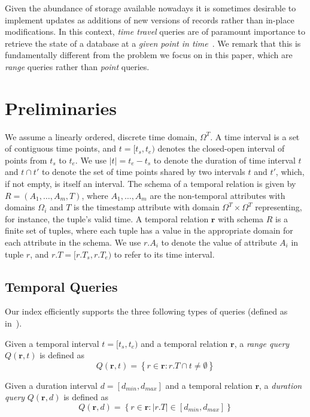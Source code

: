 \documentclass[sigconf,nonacm,anonymous]{acmart}
\theoremstyle{definition}
\newcommand{\domT}{\ensuremath{\Omega^T}}
\newcommand{\args}[2]{#1_1,\dots,#1_{#2}}
\newcommand{\R}{\ensuremath{\mathbf{r}}\xspace} %
\newcommand{\T}{\ensuremath{t}} %
\newcommand{\D}{\ensuremath{d}} %
\newcommand{\TS}{\ensuremath{t_s}}
\newcommand{\TE}{\ensuremath{t_e}}
\newcommand{\rTE}{\ensuremath{r.T_e}}
\newcommand{\rTS}{\ensuremath{r.T_s}}
\newcommand{\dmin}{\ensuremath{d_{min}}}
\newcommand{\dmax}{\ensuremath{d_{max}}}
\newcommand{\rT}{\ensuremath{r.T}}
\begin{document}
Given the abundance of storage available nowadays it is sometimes desirable to
implement updates as additions of new versions of records rather than
in-place modifications. In this context, \emph{time travel} queries
are of paramount importance to retrieve the state of a database 
at a \emph{given point in time}~\cite{DBLP:conf/icde/KaufmannMHKT13}.
We remark that this is fundamentally different from the problem we focus on in this
paper, which are \emph{range} queries rather than \emph{point} queries.

\section{Preliminaries}

We assume a linearly ordered, discrete time domain, $\domT$.  A time
interval is a set of contiguous time points, and $\T = [\TS,\TE)$
denotes the closed-open interval of points from $\TS$ to $\TE$.  We
use $|t| = \TE - \TS$ to denote the duration of time interval $\T$ and
$\T \cap \T'$ to denote the set of time points shared by two intervals
$\T$ and $\T'$, which, if not empty, is itself an interval.
%
The schema of a temporal relation is given by $R = (\args{A}{m},T)$,
where $\args{A}{m}$ are the non-temporal attributes with domains
$\Omega_i$ and $T$ is the timestamp attribute with domain
$\domT \times \domT$ representing, for instance, the tuple's valid
time.  A temporal relation $\R$ with schema $R$ is a finite set of
tuples, where each tuple has a value in the appropriate domain for
each attribute in the schema. We use $r.A_i$ to denote the value of
attribute $A_i$ in tuple $r$, and $\rT = [\rTS, \rTE)$ to refer to its
time interval. 

\subsection{Temporal Queries}

Our index efficiently supports the three following types of queries (defined as in~\cite{BehrendDGSVRK_SSTD19_period-index}).

\begin{definition}
  Given a temporal interval $\T = [\TS, \TE)$ and a temporal relation
  $\R$, a \emph{range query} $Q(\R, \T)$ is defined as
  \[
    Q(\R, \T) = \left\{r \in \R : \rT \cap \T \ne \emptyset
    \right\}
  \]
\end{definition}

\begin{definition}
	Given a duration interval $\D = [\dmin, \dmax]$ and a temporal relation $\R$,
	a \emph{duration query} $Q(\R, \D)$ is defined as
	\[
		Q(\R, \D) = \left\{r \in \R : |\rT| \in [\dmin, \dmax] \right\}
	\]
\end{definition}
\end{document}
